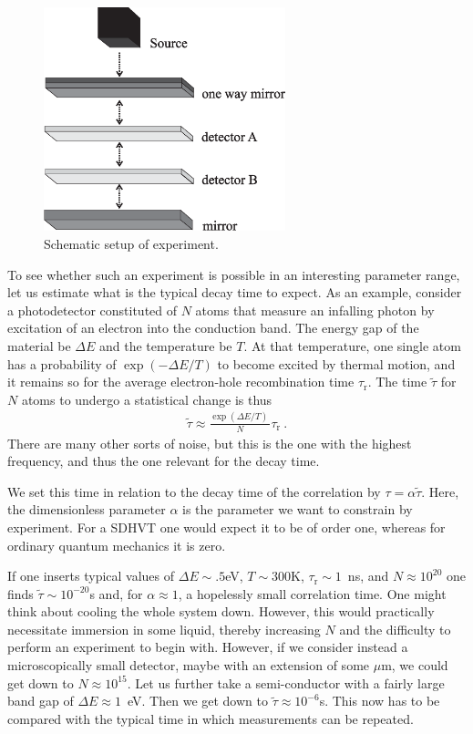 \documentclass{svjour2}                    %
\newcommand{\beqn}{\begin{eqnarray}}
\newcommand{\eeqn}{\end{eqnarray}}
\begin{document}
\begin{figure} 
\vspace*{-0.0cm}
\includegraphics[width=7cm]{exp.eps}
 
\caption{Schematic setup of experiment.
\label{fig2}}
\end{figure} 



To see whether such an experiment is possible in an interesting parameter range, 
let us estimate what is the typical decay time to 
expect.
As an example, consider a photodetector constituted of $N$ atoms that measure an infalling
photon by excitation of an electron into the conduction band. The energy gap of the 
material be $\Delta E$ and the temperature be $T$.
At that temperature, one single atom has a probability of $\exp(-\Delta E/T)$
to become excited by thermal motion, and it remains so for the average 
electron-hole recombination time $\tau_{\mathrm r}$. The 
time $\tilde \tau$ for $N$ atoms to undergo a statistical change is thus
\beqn
\tilde \tau \approx \frac{\exp(\Delta E/T)~ }{N} \tau_{\mathrm r} ~.
\eeqn
There are many other sorts of noise, but this is the one with the highest
frequency, and thus the one relevant for the decay time.

We set this time in relation to the decay time of the correlation by 
$\tau = \alpha \tilde \tau$. Here, the dimensionless parameter $\alpha$ is the parameter 
we want to constrain by experiment. For a {\sc SDHVT} one would expect it to
be of order one, whereas for ordinary quantum mechanics it is zero.

If one inserts typical values of $\Delta E \sim .5$eV, $T \sim 300$K, $\tau_{\mathrm r} \sim 1$~ns,
and $N \approx 10^{20}$ one finds $\tilde \tau \sim 10^{-20}$s and,
for $\alpha \approx 1$, a hopelessly
small correlation time. One might think about cooling the whole
system down. However, this would practically necessitate immersion in some
liquid, thereby increasing $N$ and the difficulty to perform an experiment
to begin with. However, if we consider instead a microscopically small detector,
maybe with an extension of some $\mu$m, we could get down to 
$N \approx 10^{15}$. Let us further take
a semi-conductor with a fairly large band gap of $\Delta E \approx 1$~eV.
Then we get down to $\tilde \tau \approx 10^{-6}$s. This now has to be
compared with the typical time in which measurements can be repeated. 
\end{document}
